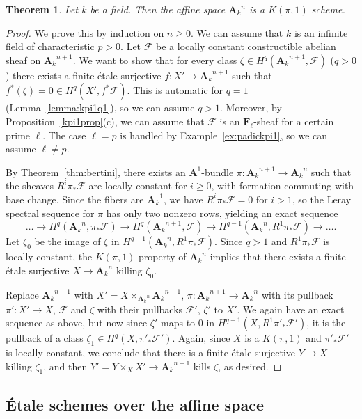 \documentclass[twoside]{amsart}
\renewcommand{\AA}{\mathbf{A}}
\newcommand{\FF}{\mathbf{F}}
\newcommand{\Ff}{\mathscr{F}}
\newcommand{\ANK}[2]{{\AA_{#2}}^{\! \! \! \!  #1}} %
\newcommand{\AN}[1]{\ANK{#1}{k}}
\renewcommand{\to}{\longrightarrow}
\theoremstyle{plain}
\newtheorem{theorem}[subsubsection]{Theorem}
\theoremstyle{definition}
\theoremstyle{remark}
\numberwithin{equation}{subsection}
\begin{document}
\begin{theorem} \label{thm:an-kpi1}
	Let $k$ be a field. Then the affine space $\AN n$ is a $K(\pi, 1)$ scheme.
\end{theorem}

\begin{proof}
We prove this by induction on $n\geq 0$. We can assume that $k$ is an infinite field of characteristic $p>0$. Let $\Ff$ be a locally constant constructible abelian sheaf on $\AN{n+1}$. We want to show that for every class $\zeta\in H^q(\AN{n+1}, \Ff)$ ($q>0$) there exists a finite \'etale surjective $f\colon X'\to \AN{n+1}$ such that $f^*(\zeta)=0\in H^q(X', f^* \Ff)$. This is automatic for $q=1$ (Lemma~\ref{lemma:kpi1q1}), so we can assume $q>1$. Moreover, by Proposition~\ref{kpi1prop}(c), we can assume that $\Ff$ is an $\FF_\ell$-sheaf for a certain prime $\ell$. The case $\ell=p$ is handled by Example~\ref{ex:padickpi1}, so we can assume $\ell\neq p$.

By Theorem~\ref{thm:bertini}, there exists an $\AA^1$-bundle $\pi\colon \AN{n+1}\to\AN{n}$ such that the sheaves $R^i \pi_* \Ff$ are locally constant for $i\geq 0$, with formation commuting with base change. Since the fibers are $\AN 1$, we have $R^i \pi_*\Ff = 0$ for $i>1$, so the Leray spectral sequence for $\pi$ has only two nonzero rows, yielding an exact sequence
\[    
	\ldots \to H^q(\AN{n}, \pi_* \Ff) \to H^q(\AN{n+1}, \Ff) \to H^{q-1}(\AN{n}, R^1 \pi_* \Ff) \to \ldots. 
\]
Let $\zeta_0$ be the image of $\zeta$ in $H^{q-1}(\AN{n}, R^1 \pi_* \Ff)$. Since $q>1$ and $R^1 \pi_* \Ff$ is locally constant, the $K(\pi, 1)$ property of $\AN{n}$ implies that there exists a finite \'etale surjective $X\to \AN{n}$ killing $\zeta_0$. 

Replace $\AN{n+1}$ with $X' = X\times_{\AN{n}} \AN{n+1}$, $\pi\colon \AN{n+1}\to \AN{n}$ with its pullback $\pi'\colon X' \to X$, $\Ff$ and $\zeta$ with their pullbacks $\Ff'$, $\zeta'$ to $X'$. We again have an exact sequence as above, but now since $\zeta'$ maps to 0 in $H^{q-1}(X, R^1 \pi'_* \Ff')$, it is the pullback of a class $\zeta_1 \in H^q(X, \pi'_* \Ff')$. Again, since $X$ is a $K(\pi, 1)$ and $\pi'_* \Ff'$ is locally constant, we conclude that there is a finite \'etale surjective $Y\to X$ killing $\zeta_1$, and then $Y'=Y\times_X X'\to \AN{n+1}$ kills $\zeta$, as desired.
\end{proof}

\subsection{\'Etale schemes over the affine space} 
\label{ss:nagata}
\end{document}
